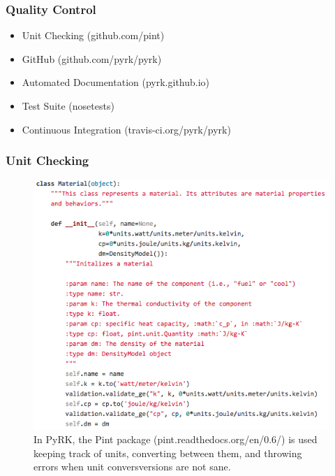\begin{frame}[fragile]
  \frametitle{Quality Control}
  \begin{itemize}
    \item Unit Checking (github.com/pint)
    \item GitHub (github.com/pyrk/pyrk)
    \item Automated Documentation (pyrk.github.io)
    \item Test Suite (nosetests)
    \item Continuous Integration (travis-ci.org/pyrk/pyrk)
  \end{itemize}
\end{frame}

\begin{frame}[fragile]
  \frametitle{Unit Checking}
  \begin{figure}[htbp!]
    \begin{center}
      \includegraphics[height=0.7\textheight]{./progress/pint_pyrk.png}
    \end{center}
    \caption{In PyRK, the Pint package (pint.readthedocs.org/en/0.6/) is used 
    keeping track of units, converting between them, and throwing errors when 
    unit conversversions are not sane.}
    \label{fig:doc_pyrk}
  \end{figure}
\end{frame}
